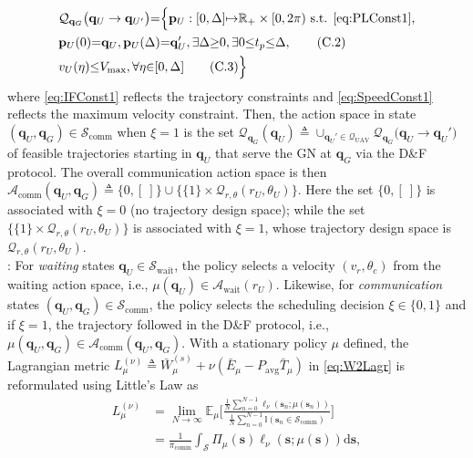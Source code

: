 \documentclass[10pt,twocolumn]{IEEEtran}
\begin{document}
\begin{align*}
	&\mathcal{Q}_{\mathbf{q}_{G}}\big({\mathbf{q}}_{U}\rightarrow{\mathbf{q}}_{U'}\big){=}\Big\{\mathbf{p}_{U}:[0,\Delta]{\mapsto}\mathbb{R}_{+}\times[0,2\pi)\text{ s.t. \ref{eq:PLConst1},}\\
	&\mathbf{p}_{U}(0){=}{\mathbf{q}}_{U},\mathbf{p}_{U}(\Delta){=}{\mathbf {q}}_{U}',{\exists}\Delta{\geq}0,{\exists}0{\leq}t_p{\leq}\Delta,\label{eq:IFConst1}\tag{C.2}\\
	&v_{U}(\eta){\leq}V_{\mathrm{max}},{\forall}\eta{\in}[0,\Delta]\label{eq:SpeedConst1}\tag{C.3}\Big\}
\end{align*}
where \ref{eq:IFConst1} reflects the trajectory constraints and \ref{eq:SpeedConst1} reflects the maximum velocity constraint. Then, the action space in state $(\mathbf{q}_{U},\mathbf{q}_{G}){\in}\mathcal{S}_{\mathrm{comm}}$ when $\xi{=}1$ is the set $\mathcal{Q}_{\mathbf{q}_{G}}(\mathbf{q}_{U}){\triangleq}\cup_{\mathbf{q}_{U}'{\in}\mathcal{Q}_{\mathrm{UAV}}}\mathcal{Q}_{\mathbf{q}_{G}}\big(\mathbf{q}_{U}{\rightarrow}\mathbf{q}_{U}'\big)$ of feasible trajectories starting in $\mathbf{q}_{U}$ that serve the GN at $\mathbf{q}_{G}$ via the D\&F protocol. The overall communication action space is then $\mathcal{A}_{\mathrm{comm}}(\mathbf{q}_{U},\mathbf{q}_{G}){\triangleq}\{0,[\ ]\}{\cup}\{\{1\}{\times}\mathcal{Q}_{r,\theta}(r_{U},\theta_{U})\}$. Here the set $\{0, [\ ]\}$ is associated with $\xi{=}0$ (no trajectory design space); while the set $\{\{1\}{\times}\mathcal{Q}_{r,\theta}(r_{U},\theta_{U})\}$ is associated with $\xi{=}1$, whose trajectory design space is $\mathcal{Q}_{r,\theta}(r_{U},\theta_{U})$.\\
: For \emph{waiting} states $\mathbf{q}_{U}{\in}\mathcal{S}_{\mathrm{wait}}$, the policy selects a velocity $(v_{r},\theta_{c})$ from the waiting action space, i.e., $\mu(\mathbf{q}_{U}){\in}\mathcal{A}_{\mathrm{wait}}(r_{U})$. Likewise, for \emph{communication} states $(\mathbf{q}_{U},\mathbf{q}_{G}){\in}\mathcal{S}_{\mathrm{comm}}$, the policy selects the scheduling decision $\xi{\in}\{0,1\}$ and if $\xi{=}1$, the trajectory followed in the D\&F protocol, i.e., $\mu(\mathbf{q}_{U},\mathbf{q}_{G}){\in}\mathcal{A}_{\mathrm{comm}}(\mathbf{q}_{U},\mathbf{q}_{G})$. With a stationary policy $\mu$ defined, the Lagrangian metric $L_{\mu}^{(\nu)}{\triangleq}\bar{W}_{\mu}^{(s)}{+}\nu(\bar{E}_{\mu}{-}P_{\mathrm{avg}}\bar{T}_{\mu})$ in \eqref{eq:W2Lagr} is reformulated using Little's Law as
\begin{align}\label{eq:CostMetric}
    L_\mu^{(\nu)}
    &= \lim_{N \rightarrow \infty} \mathbb{E}_\mu \Bigg[ \frac{\frac{1}{N}\sum_{n=0}^{N-1}  \ell_\nu(\mathbf{s}_n; \mu(\mathbf{s}_n)) }{\frac{1}{N}\sum_{n = 0}^{N-1} \mathbb I(\mathbf{s}_n \in \mathcal{S}_{\mathrm{comm}})}  \Bigg]\nonumber\\
    &= \frac{1}{\pi_{\mathrm{comm}}}\int_{\mathcal{S}} \Pi_{\mu}(\mathbf{s})\ell_\nu(\mathbf{s}; \mu(\mathbf{s}))\mathrm{d}\mathbf{s},
\end{align}
\end{document}
